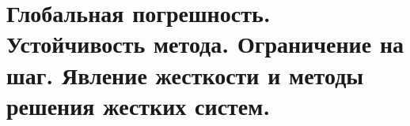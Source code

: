 \documentclass[../../calc-math-exam-2023.tex]{subfiles}
\begin{document}
    \section{Глобальная погрешность. Устойчивость метода. Ограничение на шаг. Явление жесткости и методы решения жестких систем.}\label{sec:ch27}
\end{document}
